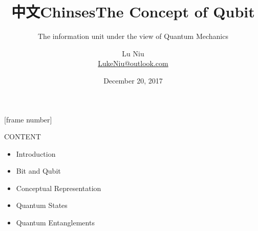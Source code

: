 \documentclass[UTF8,beamer,serif,ctexart]{beamer}
\begin{document}
{
	[frame number]	%
}

\author[Lu Niu]
{
	Lu Niu \\
	\medskip
	{\small \url{LukeNiu@outlook.com}}
}
\date{December 20, 2017}

\title{中文ChinsesThe Concept of Qubit}
\subtitle{The information unit under the view of Quantum Mechanics}

\setlength{\parindent}{1em}

\begin{frame}%
	\begin{titlepage}
	\end{titlepage}
\end{frame}

\begin{frame}{CONTENT}{}
\begin{itemize}  
	\item Introduction
	\item Bit and Qubit
	\item Conceptual Representation
	\item Quantum States
	\item Quantum Entanglements
\end{itemize} 
\end{frame}
\end{document}
